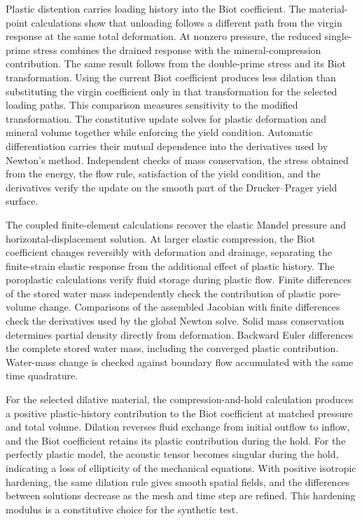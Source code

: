 Plastic distention carries loading history into the Biot coefficient.  The
material-point calculations show that unloading follows a different path
from the virgin response at the same total deformation.  At nonzero
pressure, the reduced single-prime stress combines the drained response
with the mineral-compression contribution.  The same result follows from
the double-prime stress and its Biot transformation.  Using
the current Biot coefficient produces less dilation than substituting the virgin
coefficient only in that transformation for the selected loading paths.
This comparison measures sensitivity to the modified transformation.
The constitutive update solves for plastic deformation and mineral volume
together while enforcing the yield condition.  Automatic differentiation
carries their mutual dependence into the derivatives used by Newton's
method.  Independent checks of mass conservation, the stress obtained from
the energy, the flow rule, satisfaction of the yield condition, and the derivatives verify the update on the smooth
part of the Drucker--Prager yield surface.

The coupled finite-element calculations recover the elastic Mandel pressure
and horizontal-displacement solution.  At larger elastic compression, the
Biot coefficient changes reversibly with deformation and drainage, separating
the finite-strain elastic response from the additional effect of plastic
history.  The poroplastic calculations verify fluid storage during plastic
flow.  Finite differences of the stored water mass independently check the
contribution of plastic pore-volume change.  Comparisons of the assembled
Jacobian with finite differences check the derivatives used by the global
Newton solve.
Solid mass conservation determines partial density directly from deformation.
Backward Euler differences the complete stored water mass, including the
converged plastic contribution.  Water-mass change is checked against
boundary flow accumulated with the same time quadrature.

For the selected dilative material, the compression-and-hold calculation
produces a positive plastic-history contribution to the Biot coefficient at
matched pressure and total volume. Dilation reverses fluid exchange from
initial outflow to inflow,
and the Biot coefficient retains its plastic contribution during the hold.
For the perfectly plastic model, the acoustic tensor becomes singular
during the hold, indicating a loss of ellipticity of the mechanical
equations.
With positive isotropic hardening, the same dilation rule gives smooth
spatial fields, and the differences between solutions decrease as the mesh
and time step are refined.
This hardening modulus is a constitutive choice for the synthetic test.

